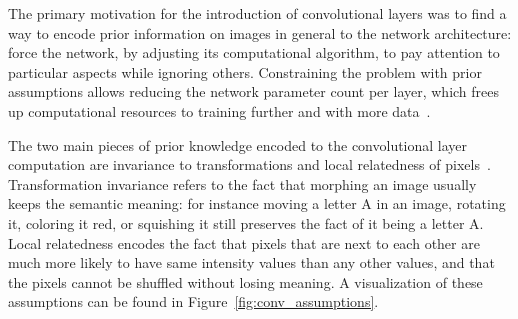 \documentclass[english,twoside,openright]{UH_DS_MSc}
\begin{document}
The primary motivation for the introduction of convolutional layers was to find a way to encode prior information 
on images in general to the network architecture: force the network, by adjusting its computational 
algorithm, to pay attention to particular aspects while ignoring others. Constraining the problem with 
 prior assumptions allows reducing the network parameter count per layer, which frees up 
computational resources to training further and with more data~\cite{alexnet}.


The two main pieces of prior knowledge encoded to the convolutional layer computation
 are invariance to transformations and local relatedness of pixels~\cite{princebook}.
Transformation invariance refers to the fact that morphing an image usually keeps the semantic meaning: for instance
 moving a letter A in an image, 
rotating it, coloring it red, or squishing it still preserves the fact of it being a letter A. Local relatedness 
encodes the fact that pixels that are next to each other are much more likely to have same intensity values than any other 
values, and that the pixels cannot be shuffled without losing meaning. A visualization of these assumptions can be found in 
Figure~\ref{fig:conv_assumptions}.
\end{document}
